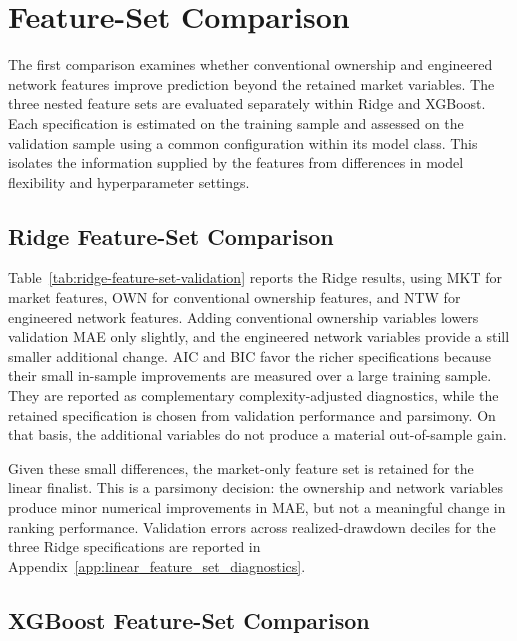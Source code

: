 \section{Feature-Set Comparison}
\label{sec:feature_set_results}

The first comparison examines whether conventional ownership and engineered network features improve prediction beyond the retained market variables. The three nested feature sets are evaluated separately within Ridge and XGBoost. Each specification is estimated on the training sample and assessed on the validation sample using a common configuration within its model class. This isolates the information supplied by the features from differences in model flexibility and hyperparameter settings.

\subsection{Ridge Feature-Set Comparison}
\label{sec:linear_feature_results}

Table~\ref{tab:ridge-feature-set-validation} reports the Ridge results, using MKT for market features, OWN for conventional ownership features, and NTW for engineered network features. Adding conventional ownership variables lowers validation MAE only slightly, and the engineered network variables provide a still smaller additional change. AIC and BIC favor the richer specifications because their small in-sample improvements are measured over a large training sample. They are reported as complementary complexity-adjusted diagnostics, while the retained specification is chosen from validation performance and parsimony. On that basis, the additional variables do not produce a material out-of-sample gain.



\noindent
Given these small differences, the market-only feature set is retained for the linear finalist. This is a parsimony decision: the ownership and network variables produce minor numerical improvements in MAE, but not a meaningful change in ranking performance. Validation errors across realized-drawdown deciles for the three Ridge specifications are reported in Appendix~\ref{app:linear_feature_set_diagnostics}.

\subsection{XGBoost Feature-Set Comparison}
\label{sec:nonlinear_feature_results}

